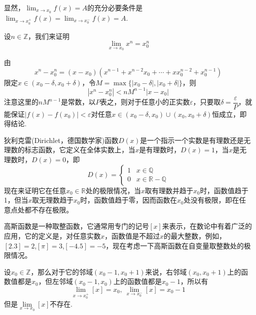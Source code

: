   显然，$\lim_{x \to x_0} f(x) = A$的充分必要条件是 $\lim_{x \to x_0^+} f(x) = \lim_{x \to x_0^-} f(x) = A$.
 
\begin{example}
  \label{example:limit-of-x-power-integer}
  设$n \in \mathbb{Z}$，我们来证明
  \[ \lim_{x \to x_0} x^n = x_0^n \]

  由
  \[ x^n-x_0^n = (x-x_0)(x^{n-1}+x^{n-2}x_0+\cdots+xx_0^{n-2}+x_0^{n-1}) \]
  限定$x \in (x_0-\delta,x_0+\delta)$，令$M=\max\{|x_0-\delta|,|x_0+\delta|\}$，则
  \[ |x^n-x_0^n| < nM^{n-1}|x-x_0| \]
  注意这里的$nM^{n-1}$是常数，以$P$表之，则对于任意小的正实数$\varepsilon$，只要取$\delta=\dfrac{\varepsilon}{P}$，就能保证$|f(x)-f(x_0)|<\varepsilon$对任意$x \in (x_0-\delta,x_0)\cup(x_0,x_0+\delta)$恒成立，即得结论.
\end{example}

\begin{example}
  \label{example:limit-of-dirichlet-function}
  狄利克雷(Dirichlet，德国数学家)函数$D(x)$是一个指示一个实数是有理数还是无理数的标志函数，它定义在全体实数上，当$x$是有理数时，$D(x)=1$，当$x$是无理数时，$D(x)=0$，即
  \[
    D(x) =
    \begin{cases}
      1 & x \in \mathbb{Q} \\
      0 & x \in \mathbb{R}-\mathbb{Q}
    \end{cases}
  \]
  现在来证明它在任意$x_0 \in \mathbb{R}$处的极限情况，当$x$取有理数并趋于$x_0$时，函数值趋于1，但当$x$取无理数趋于$x_0$时，函数值趋于零，因而函数在$x_0$处没有极限，即在任意点处都不存在极限。
\end{example}

  \begin{example}
    \label{example:single-limits-of-gausse-function}
    高斯函数是一种取整函数，它通常用专门的记号$[x]$来表示，在数论中有着广泛的应用，它的定义是，对任意实数$x$，函数值是不超过$x$的最大整数，例如，$[2.3]=2$,$[\pi]=3$,$[-4.5]=-5$，现在考虑一下高斯函数在自变量取整数处的极限情况。

    设$x_0 \in \mathbb{Z}$，那么对于它的邻域$(x_0-1,x_0+1)$来说，右邻域$(x_0,x_0+1)$上的函数值都是$x_0$，但左邻域$(x_0-1,x_0)$上的函数值都是$x_0-1$，所以有
    \[ \lim_{x \to x_0^+} [x] = x_0, \  \lim_{x \to x_0^-} [x] = x_0-1 \]
    但是$\lim\limits_{x \to x_0}[x]$不存在. 
\end{example}

